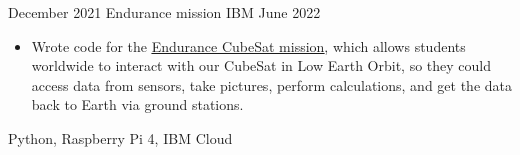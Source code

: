 %
%
%


\begin{projects}

    \project
        {December 2021}
        {Endurance mission}
        {IBM}
        {June 2022}
        {
            \begin{itemize}
                \item Wrote code for the \href{https://endurancein.space/}{\underline{Endurance CubeSat mission}},
                      which allows students worldwide to interact 
                      with our CubeSat in Low Earth Orbit, so they could
                      access data from sensors, take pictures, perform calculations, 
                      and get the data back to Earth via ground stations.
            \end{itemize}
        }
        {
            Python,
            Raspberry Pi 4,
            IBM Cloud
        }
    \emptySeparator




\end{projects}
